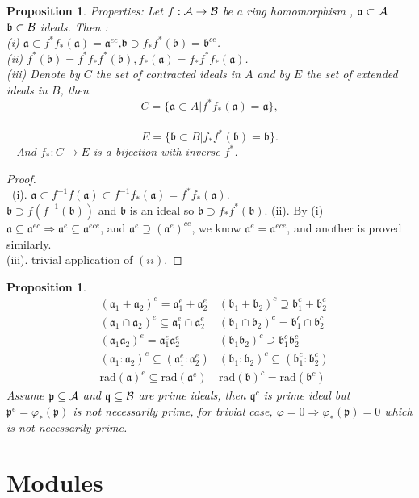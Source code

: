 \documentclass[11pt]{article}
\newtheorem{prop}[thm]{Proposition}
\newcommand{\sca}{{\mathfrak a}}
\newcommand{\scb}{{\mathfrak b}}
\newcommand{\scp}{{\mathfrak p}}
\newcommand{\scq}{\mathfrak q}
\newcommand{\cala}{{\cal A}}
\newcommand{\calb}{{\cal B}}
\newcommand{\Lrta}{\Longrightarrow}
\begin{document}
\begin{prop}\label{prop:properties_extension_contractino}
Properties: Let $f: \cala\rightarrow \calb$ be a ring homomorphism , $\sca\subset \cala$ $\scb\subset \calb$ ideals. Then :\\
(i) $\sca\subset f^*f_*(\sca)=\sca^{e c}$,$\scb\supset f_{*}f^*(\scb)=\scb^{ce}$.\\
(ii) $f^*(\scb)=f^* f_*f^*(\scb), f_*(\sca)=f_* f^*f_*(\sca)$.\\
(iii) Denote by $C$ the set of contracted ideals in $A$ and by $E$ the set of extended ideals in $B$, then 
$$
C=\{\sca\subset A|f^*f_*(\sca)=\sca\},
$$
 
$$
E=\{\scb\subset B| f_* f^*(\scb)=\scb\}.
$$ 
And $f_*: C\rightarrow E$ is a bijection with inverse $f^*$.
\end{prop}
\begin{proof}\ \\
 (i). $\sca\subset f^{-1}f(\sca)\subset f^{-1}f_{*}(\sca)=f^{*}f_*(\sca)$.\\
$\scb \supset f(f^{-1}(\scb))$ and $\scb$ is an ideal so $\scb \supset f_{*}f^*(\scb)$. 
(ii). By (i) $\sca\subseteq\sca^{ec}\Lrta \sca^{e}\subseteq \sca^{ece}$, and $\sca^{e}\supseteq(\sca^{e})^{ce}$, we know $\sca^{e}=\sca^{ece}$, and another is proved similarly.\\
(iii). trivial application of $(ii)$.
\end{proof}
\begin{prop}\label{prop:properties_contraction_extension}
$$
\begin{aligned}
&(\sca_1+\sca_2)^e=\sca^e_1+\sca_2^e & (\scb_1+\scb_2)^c\supseteq \scb^c_1+\scb_2^c\\
& (\sca_1\cap\sca_2)^e\subseteq\sca_1^e\cap\sca_2^e & (\scb_1\cap\scb_2)^c=\scb_1^c\cap\scb_2^c\\
& (\sca_1\sca_2)^e=\sca_1^e\sca_2^e & (\scb_1\scb_2)^c\supseteq\scb_1^c\scb_2^c\\
&(\sca_1:\sca_2)^e\subseteq(\sca_1^e:\sca_2^e)& (\scb_1:\scb_2)^c\subseteq (\scb_1^c:\scb_2^c)\\
&\text{rad}(\sca)^e\subseteq\text{rad}(\sca^e) & \text{rad}(\scb)^c=\text{rad}(\scb^c)
\end{aligned}
$$
Assume $\scp\subseteq\cala$ and $\scq\subseteq\calb$ are prime ideals, then $\scq^c$ is prime ideal but $\scp^e=\varphi_*(\scp)$ is not necessarily prime, for  trivial case, $\varphi=0\Lrta \varphi_*(\scp)=0$ which is not necessarily prime. 
\end{prop}
\section{Modules}
\end{document}
